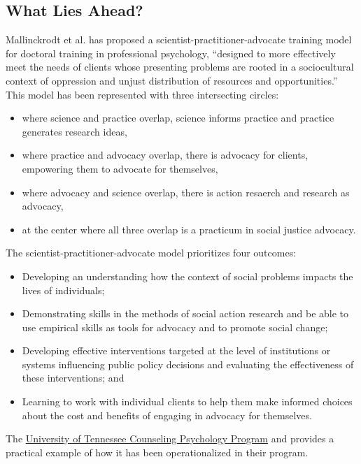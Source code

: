 \documentclass[
  english,
]{book}
\providecommand{\tightlist}{%
  \setlength{\itemsep}{0pt}\setlength{\parskip}{0pt}}
\begin{document}
\hypertarget{what-lies-ahead}{%
\subsection{What Lies Ahead?}\label{what-lies-ahead}}

Mallinckrodt et al. \citeyearpar{mallinckrodt_scientist-practitioner-advocate_2014} has proposed a scientist-practitioner-advocate training model for doctoral training in professional psychology, ``designed to more effectively meet the needs of clients whose presenting problems are rooted in a sociocultural context of oppression and unjust distribution of resources and opportunities.'' This model has been represented with three intersecting circles:

\begin{itemize}
\tightlist
\item
  where science and practice overlap, science informs practice and practice generates research ideas,
\item
  where practice and advocacy overlap, there is advocacy for clients, empowering them to advocate for themselves,
\item
  where advocacy and science overlap, there is action resaerch and research as advocacy,
\item
  at the center where all three overlap is a practicum in social justice advocacy.
\end{itemize}

The scientist-practitioner-advocate model prioritizes four outcomes:

\begin{itemize}
\tightlist
\item
  Developing an understanding how the context of social problems impacts the lives of individuals;
\item
  Demonstrating skills in the methods of social action research and be able to use empirical skills as tools for advocacy and to promote social change;
\item
  Developing effective interventions targeted at the level of institutions or systems influencing public policy decisions and evaluating the effectiveness of these interventions; and
\item
  Learning to work with individual clients to help them make informed choices about the cost and benefits of engaging in advocacy for themselves.
\end{itemize}

The \href{https://psychology.utk.edu/grad/spa_model.php}{University of Tennessee Counseling Psychology Program} and provides a practical example of how it has been operationalized in their program.
\end{document}
